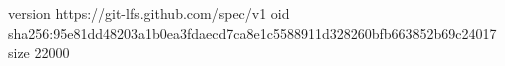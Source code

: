 version https://git-lfs.github.com/spec/v1
oid sha256:95e81dd48203a1b0ea3fdaecd7ca8e1c5588911d328260bfb663852b69c24017
size 22000
